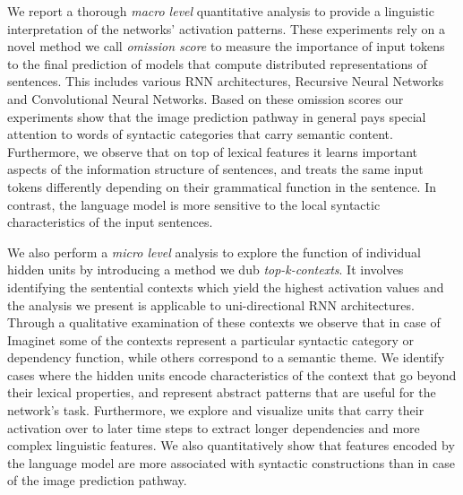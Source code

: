 We report a thorough \emph{macro level} quantitative analysis to
provide a linguistic interpretation of the networks' activation
patterns. These experiments rely on a novel method we
call \emph{omission score} to measure the importance of input tokens 
to the final prediction of models that compute distributed representations 
of sentences. This includes various RNN architectures, Recursive Neural Networks 
and Convolutional Neural Networks.\label{edit:introomissiongeneral}
Based on these omission scores our experiments show that the image prediction 
pathway in general pays special attention to words of syntactic categories that 
carry semantic content. Furthermore, we observe that on top of
lexical features it learns important aspects of the information structure of sentences,
and treats the same input tokens differently depending on their
grammatical function in the sentence. In contrast, the language model
is more sensitive to the local syntactic characteristics of the input
sentences.


We also perform a \emph{micro level} analysis to explore \label{edit:introtopkgeneral}
the function of individual hidden units by introducing a method we dub \emph{top-k-contexts}.
It involves identifying the sentential contexts which yield the 
highest activation values and the analysis we present is applicable 
to uni-directional RNN architectures.
Through a qualitative examination of these contexts we
observe that in case of {\sc Imaginet} some of the contexts represent a particular 
syntactic category or dependency function, while others correspond to a semantic theme. 
We identify cases where the hidden units encode characteristics of 
the context that go beyond their lexical properties, and represent abstract 
patterns that are useful for the network's task. 
Furthermore, we explore and visualize units that carry their
activation over to later time steps to 
extract longer dependencies and more complex linguistic features. 
We also quantitatively show that features encoded by the language model are more associated 
with syntactic constructions than in case of the image prediction pathway.


